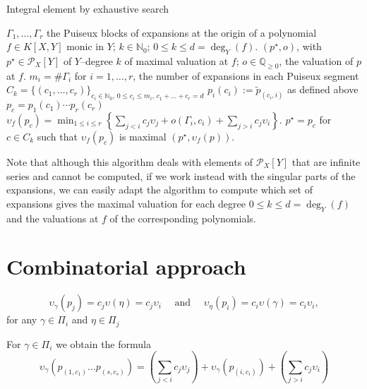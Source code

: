 \documentclass[a4paper,11pt]{amsart}%
\theoremstyle{definition}
\theoremstyle{plain}
\theoremstyle{remark}
\newcommand{\Q}{{\mathbb Q}}
\newcommand{\N}{{\mathbb N}}
\begin{document}
\begin{algorithm}[H]                      %
\caption{Integral element by exhaustive search}          %
\label{alg:exhaustive}
\begin{algorithmic}[1]
\REQUIRE $\Gamma_1, \dots, \Gamma_r$ the Puiseux blocks of expansions at the origin of a polynomial $f \in K[X,Y]$ monic in $Y$;
$k \in \N_0$; $0 \leq k \leq d = \deg_Y(f)$.
\ENSURE $(p^{\star}, o)$, with $p^{\star} \in {\mathcal{P}_{X}}[Y]$ of $Y$--degree $k$ of
maximal valuation at $f$; $o \in \Q_{\geq 0}$, the valuation of $p$ at $f$.
\STATE $m_i = \#\Gamma_i$ for $i = 1, \dots, r$, the number of expansions in each Puiseux segment
\STATE $C_k = \{(c_1, \dots, c_r)\}_{c_i \in \N_0 \mbox{, } 0 \leq c_i \leq m_i \mbox{, } c_1 + \dots + c_r = d}$
\STATE $p_i(c_i) := \tilde p_{(c_i, i)}$ as defined above
\ENDFOR
\STATE $p_{c} = p_{1}(c_{1})\cdots p_{r}(c_{r})$
\STATE $\upsilon_{f}(p_{c})=\min_{1 \leq i \leq r}\left\{\sum_{j<i} c_j \upsilon_j + o(\Gamma_{i},c_{i})+\sum_{j>i}
c_j \upsilon_i\right\}$.
\ENDFOR
\STATE $p^{\star} = p_c$ for $c \in C_k$ such that $\upsilon_{f}(p_{c})$ is maximal
\RETURN $(p^{\star}, \upsilon_{f}(p))$.
\end{algorithmic}
\end{algorithm}

Note that although this algorithm deals with elements of $\mathcal{P}_{X}[Y]$ that are infinite series and cannot be computed, if we work instead with the singular parts of the expansions, we can easily adapt the algorithm to compute which set of expansions gives the maximal valuation for each degree $0 \leq k \leq d = \deg_Y(f)$ and the valuations at $f$ of the corresponding polynomials.

\section{Combinatorial approach}


$$
\upsilon_{\gamma}(p_j) = c_j \upsilon(\eta) = c_j \upsilon_i \quad \text{ and } \quad \upsilon_{\eta}(p_i) = c_i \upsilon(\gamma) = c_i \upsilon_i,
$$
for any $\gamma \in\Pi_{i}$ and $\eta \in \Pi_{j}$

For $\gamma \in \Pi_i$ we obtain the formula
\[
\boxed{
\upsilon_{\gamma}(p_{(1, c_1)} \dots p_{(s, c_s)}) = \left(\textstyle \sum_{j < i} c_j \upsilon_j\right) + \upsilon_{\gamma}(p_{(i,c_i)}) + \left(\textstyle  \sum_{j > i} c_j \upsilon_i \right)}
\]
\end{document}

